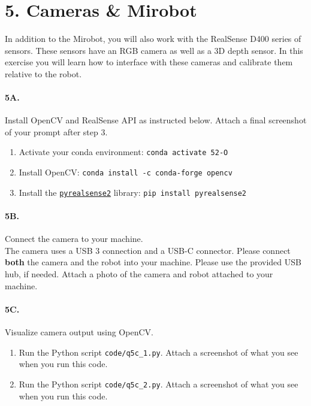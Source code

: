 \newpage
\section*{5. Cameras \& Mirobot}

In addition to the Mirobot, you will also work with the RealSense D400 series of sensors.
These sensors have an RGB camera as well as a 3D depth sensor.
In this exercise you will learn how to interface with these cameras and calibrate them relative to the robot.

\paragraph{5A.} Install OpenCV and RealSense API as instructed below. Attach a final screenshot of your prompt after step 3.
\begin{enumerate}
    \item Activate your conda environment: \texttt{conda activate 52-O}
    \item Install OpenCV: \texttt{conda install -c conda-forge opencv}
    \item Install the \href{https://github.com/IntelRealSense/librealsense/tree/master/wrappers/python#installation}{\texttt{pyrealsense2}} library: \texttt{pip install pyrealsense2}
\end{enumerate}

\paragraph{5B.} Connect the camera to your machine.\\

The camera uses a USB 3 connection and a USB-C connector. Please connect \textbf{both} the camera and the robot into your machine.
Please use the provided USB hub, if needed.
Attach a photo of the camera and robot attached to your machine.

\paragraph{5C.} Visualize camera output using OpenCV.

\begin{enumerate}
    \item Run the Python script \texttt{code/q5c\_1.py}. Attach a screenshot of what you see when you run this code.
    \item Run the Python script \texttt{code/q5c\_2.py}. Attach a screenshot of what you see when you run this code.
\end{enumerate}

